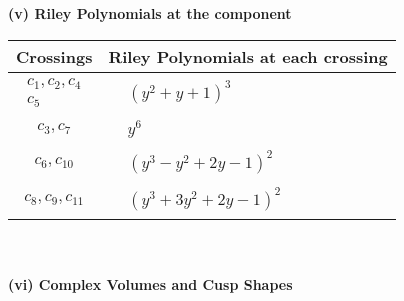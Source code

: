 \documentclass[1p]{elsarticle_modified}
\theoremstyle{definition}
\begin{document}
\newpage\renewcommand{\arraystretch}{1}
\flushleft \textbf{(v) Riley Polynomials at the component}\newline \\
\begin{tabular}{m{50pt}|m{274pt}}
Crossings & \hspace{64pt}Riley Polynomials at each crossing \\
\hline $$\begin{aligned}c_{1},c_{2},c_{4}\\c_{5}\end{aligned}$$&$\begin{aligned}
&(y^2+y+1)^3
\end{aligned}$\\
\hline $$\begin{aligned}c_{3},c_{7}\end{aligned}$$&$\begin{aligned}
&y^6
\end{aligned}$\\
\hline $$\begin{aligned}c_{6},c_{10}\end{aligned}$$&$\begin{aligned}
&(y^3- y^2+2 y-1)^2
\end{aligned}$\\
\hline $$\begin{aligned}c_{8},c_{9},c_{11}\end{aligned}$$&$\begin{aligned}
&(y^3+3 y^2+2 y-1)^2
\end{aligned}$\\
\hline
\end{tabular}\\~\\
\newpage\flushleft \textbf{(vi) Complex Volumes and Cusp Shapes}
\end{document}
